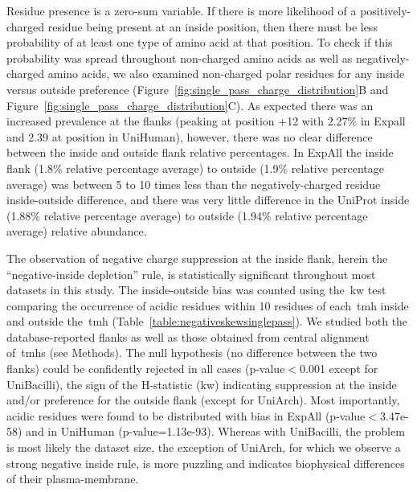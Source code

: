 Residue presence is a zero\--sum variable.
If there is more likelihood of a positively\--charged residue being present at an inside position, then there must be less probability of at least one type of amino acid at that position.
To check if this probability was spread throughout non\--charged amino acids as well as negatively\--charged amino acids, we also examined non-charged polar residues for any inside versus outside preference (Figure~\ref{fig:single_pass_charge_distribution}B and Figure~\ref{fig:single_pass_charge_distribution}C).
As expected there was an increased prevalence at the flanks (peaking at position +12 with 2.27\% in Expall and 2.39 at position  in UniHuman), however, there was no clear difference between the inside and outside flank relative percentages.
In ExpAll the inside flank (1.8\% relative percentage average) to outside (1.9\% relative percentage average) was between 5 to 10 times less than the negatively\--charged residue inside\--outside difference, and there was very little difference in the UniProt inside (1.88\% relative percentage average) to outside (1.94\% relative percentage average) relative abundance.


The observation of negative charge suppression at the inside flank, herein the ``negative-inside depletion'' rule, is statistically significant throughout most datasets in this study.
The inside-outside bias was counted using the~\gls{kw} test comparing the occurrence of acidic residues within 10 residues of each~\gls{tmh} inside and outside the~\gls{tmh} (Table~\ref{table:negativeskewsinglepass}).
We studied both the database-reported flanks as well as those obtained from central alignment of~\gls{tmh}s (see Methods).
The null hypothesis (no difference between the two flanks) could be confidently rejected in all cases (p\--value$<$0.001 except for UniBacilli), the sign of the H-statistic (\gls{kw}) indicating suppression at the inside and/or preference for the outside flank (except for UniArch).
Most importantly, acidic residues were found to be distributed with bias in ExpAll (p\--value$<$3.47e-58) and in UniHuman (p\--value=1.13e-93).
Whereas with UniBacilli, the problem is most likely the dataset size, the exception of UniArch, for which we observe a strong negative inside rule, is more puzzling and indicates biophysical differences of their plasma-membrane.

